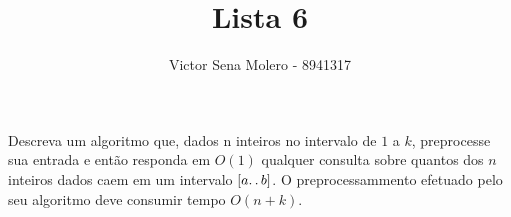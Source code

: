 \documentclass[12pt]{article}
\newenvironment{problem}[2][Ex]{\begin{trivlist}
\item[\hskip \labelsep {\bfseries #1}\hskip \labelsep {\bfseries #2.}]}{\end{trivlist}}
\begin{document}
 
 
\title{Lista 6}
\author{Victor Sena Molero - 8941317}
\maketitle
 
\begin{problem}{8}
Descreva um algoritmo que, dados n inteiros no intervalo de $1$ a $k$, preprocesse sua entrada e então responda em $O(1)$ qualquer consulta sobre quantos dos $n$ inteiros dados caem em um intervalo $[a \ldotp \ldotp b]$. O preprocessammento efetuado pelo seu algoritmo deve consumir tempo $O(n+k)$.
\end{problem}
 
\end{document}

